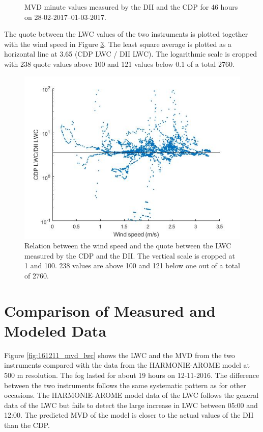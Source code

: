 \begin{figure}[ht]
\begin{subfigure}{.49\textwidth}
  \label{fig:0228-0301_MVD_DIIvsCDP}
\end{subfigure}
\caption{MVD minute values measured by the DII and the CDP for 46 hours on 28-02-2017--01-03-2017.}
\label{fig:0228-0301_mvd}
\end{figure}

The quote between the LWC values of the two instruments is plotted together with the wind speed in Figure \ref{fig:0228-0301_WSvslwcquote}. The least square average is plotted as a horizontal line at 3.65 (CDP LWC / DII LWC). The logarithmic scale is cropped with 238 quote values above 100 and 121 values below 0.1 of a total 2760.

\begin{figure}[ht]
  \centering
  \includegraphics[width=0.5\linewidth]{figures/0228-0301/Relation_between_lwcquote_and_wind_speed_17022801-17030123}
\caption{Relation between the wind speed and the quote between the LWC measured by the CDP and the DII. The vertical scale is cropped at 1 and 100. 238 values are above 100 and 121 below one out of a total of 2760.}
\label{fig:0228-0301_WSvslwcquote}
\end{figure}

\section{Comparison of Measured and Modeled Data}

Figure \ref{fig:161211_mvd_lwc} shows the LWC and the MVD from the two instruments compared with the data from the HARMONIE-AROME model at 500 m resolution. The fog lasted for about 19 hours on 12-11-2016. The difference between the two instruments follows the same systematic pattern as for other occasions. The HARMONIE-AROME model data of the LWC follows the general data of the LWC but fails to detect the large increase in LWC between 05:00 and 12:00. The predicted MVD of the model is closer to the actual values of the DII than the CDP.

